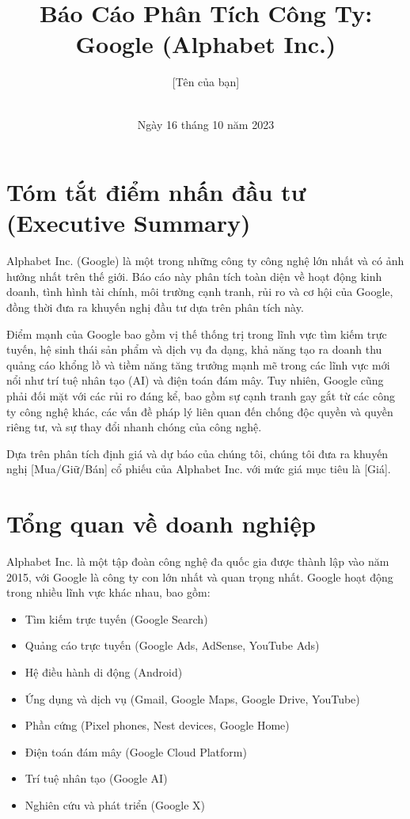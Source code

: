 \documentclass[12pt]{article}
\title{Báo Cáo Phân Tích Công Ty: Google (Alphabet Inc.)}
\author{ [Tên của bạn] \\ [Chức danh] \\ [Ngày tháng]}
\date{Ngày 16 tháng 10 năm 2023}
\begin{document}
\maketitle


\newpage

\tableofcontents

\newpage

\section*{Tóm tắt điểm nhấn đầu tư (Executive Summary)}

Alphabet Inc. (Google) là một trong những công ty công nghệ lớn nhất và có ảnh hưởng nhất trên thế giới. Báo cáo này phân tích toàn diện về hoạt động kinh doanh, tình hình tài chính, môi trường cạnh tranh, rủi ro và cơ hội của Google, đồng thời đưa ra khuyến nghị đầu tư dựa trên phân tích này.

Điểm mạnh của Google bao gồm vị thế thống trị trong lĩnh vực tìm kiếm trực tuyến, hệ sinh thái sản phẩm và dịch vụ đa dạng, khả năng tạo ra doanh thu quảng cáo khổng lồ và tiềm năng tăng trưởng mạnh mẽ trong các lĩnh vực mới nổi như trí tuệ nhân tạo (AI) và điện toán đám mây.  Tuy nhiên, Google cũng phải đối mặt với các rủi ro đáng kể, bao gồm sự cạnh tranh gay gắt từ các công ty công nghệ khác, các vấn đề pháp lý liên quan đến chống độc quyền và quyền riêng tư, và sự thay đổi nhanh chóng của công nghệ.

Dựa trên phân tích định giá và dự báo của chúng tôi, chúng tôi đưa ra khuyến nghị [Mua/Giữ/Bán] cổ phiếu của Alphabet Inc. với mức giá mục tiêu là [Giá].

\newpage

\section{Tổng quan về doanh nghiệp}

Alphabet Inc. là một tập đoàn công nghệ đa quốc gia được thành lập vào năm 2015, với Google là công ty con lớn nhất và quan trọng nhất.  Google hoạt động trong nhiều lĩnh vực khác nhau, bao gồm:

\begin{itemize}
    \item Tìm kiếm trực tuyến (Google Search)
    \item Quảng cáo trực tuyến (Google Ads, AdSense, YouTube Ads)
    \item Hệ điều hành di động (Android)
    \item Ứng dụng và dịch vụ (Gmail, Google Maps, Google Drive, YouTube)
    \item Phần cứng (Pixel phones, Nest devices, Google Home)
    \item Điện toán đám mây (Google Cloud Platform)
    \item Trí tuệ nhân tạo (Google AI)
    \item Nghiên cứu và phát triển (Google X)
\end{itemize}
\end{document}
